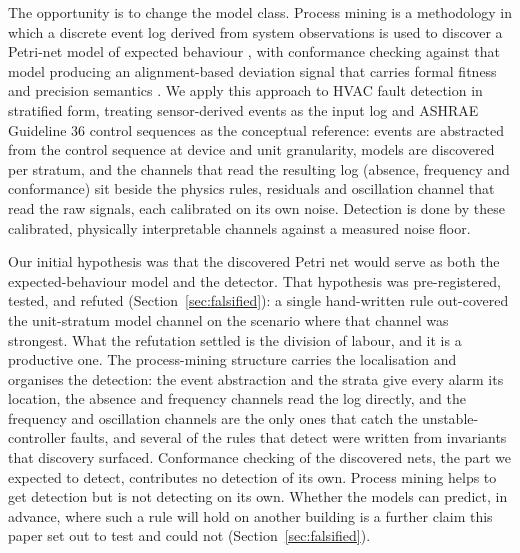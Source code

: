 \documentclass[11pt,letterpaper]{article}
\begin{document}
The opportunity is to change the model class. Process mining is a methodology in which a discrete event log derived from system observations is used to discover a Petri-net model of expected behaviour \cite{murata1989petrinets}, with conformance checking against that model producing an alignment-based deviation signal that carries formal fitness and precision semantics \cite{vanderaalst2016processmining,adriansyah2011alignments,vanderaalst2012replaying}. We apply this approach to HVAC fault detection in stratified form, treating sensor-derived events as the input log and ASHRAE Guideline 36 control sequences \cite{ashrae2021guideline36} as the conceptual reference: events are abstracted from the control sequence at device and unit granularity, models are discovered per stratum, and the channels that read the resulting log (absence, frequency and conformance) sit beside the physics rules, residuals and oscillation channel that read the raw signals, each calibrated on its own noise. Detection is done by these calibrated, physically interpretable channels against a measured noise floor.

Our initial hypothesis was that the discovered Petri net would serve as both the expected-behaviour model and the detector. That hypothesis was pre-registered, tested, and refuted (Section~\ref{sec:falsified}): a single hand-written rule out-covered the unit-stratum model channel on the scenario where that channel was strongest. What the refutation settled is the division of labour, and it is a productive one. The process-mining structure carries the localisation and organises the detection: the event abstraction and the strata give every alarm its location, the absence and frequency channels read the log directly, and the frequency and oscillation channels are the only ones that catch the unstable-controller faults, and several of the rules that detect were written from invariants that discovery surfaced. Conformance checking of the discovered nets, the part we expected to detect, contributes no detection of its own. Process mining helps to get detection but is not detecting on its own. Whether the models can predict, in advance, where such a rule will hold on another building is a further claim this paper set out to test and could not (Section~\ref{sec:falsified}).
\end{document}

